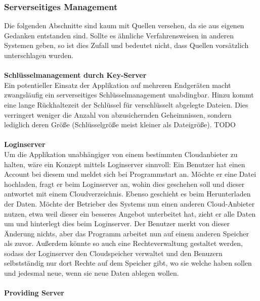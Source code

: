 \documentclass[13pt,a4paper,bibliography=totocnumbered,listof=totocnumbered]{scrartcl}
\begin{document}
\subsubsection{Serverseitiges Management}
Die folgenden Abschnitte sind kaum mit Quellen versehen, da sie aus eigenen Gedanken entstanden sind. Sollte es ähnliche Verfahrensweisen in anderen Systemen geben, so ist dies Zufall und bedeutet nicht, dass Quellen vorsätzlich unterschlagen wurden.\\\\
\textbf{Schlüsselmanagement durch Key-Server}\\
Ein potentieller Einsatz der Applikation auf mehreren Endgeräten macht zwangsläufig ein serverseitiges Schlüsselmanagement unabdingbar. Hinzu kommt eine lange Rückhaltezeit der Schlüssel für verschlüsselt abgelegte Dateien. Dies verringert weniger die Anzahl von abzusichernden Geheimnissen, sondern lediglich deren Größe (Schlüsselgröße meist kleiner als Dateigröße). TODO \cite{38}\\
\\\textbf{Loginserver}\\
Um die Applikation unabhängiger von einem bestimmten Cloudanbieter zu halten, wäre ein Konzept mittels Loginserver sinnvoll: Ein Benutzer hat einen Account bei diesem und meldet sich bei Programmstart an. Möchte er eine Datei hochladen, fragt er beim Loginserver an, wohin dies geschehen soll und dieser antwortet mit einem Cloudverzeichnis. Ebenso geschieht es beim Herunterladen der Daten. Möchte der Betrieber des Systems nun einen anderen Cloud-Anbieter nutzen, etwa weil dieser ein besseres Angebot unterbeitet hat, zieht er alle Daten um und hinterlegt dies beim Loginserver. Der Benutzer merkt von dieser Änderung nichts, aber das Programm arbeitet nun auf einem anderen Speicher als zuvor. Außerdem könnte so auch eine Rechteverwaltung gestaltet werden, sodass der Loginserver den Cloudspeicher verwaltet und den Benuzern selbstständig nur dort Rechte auf dem Speicher gibt, wo sie welche haben sollen und jedesmal neue, wenn sie neue Daten ablegen wollen.\\
\\\textbf{Providing Server}\label{provV}\\
\end{document}
